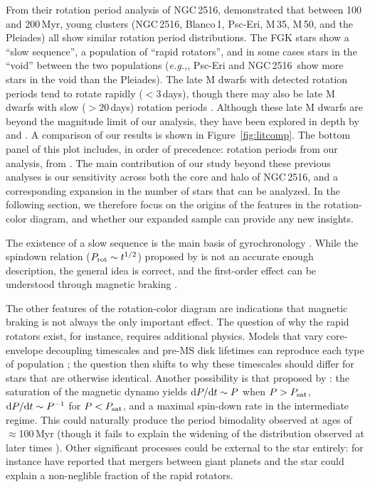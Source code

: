 \documentclass[12pt,twocolumn,tighten]{aastex63}
\newcommand{\cn}{NGC\,2516} %
\begin{document}
From their rotation period analysis of \cn,
\citet{fritzewski_rotation_2020} demonstrated that between 100 and
200\,Myr, young clusters (\cn, Blanco\,1, Psc-Eri, M\,35, M\,50, and
the Pleiades) all show similar rotation period distributions.  The FGK
stars show a ``slow sequence'', a population of ``rapid rotators'',
and in some cases stars in the ``void'' between the two populations
({\it e.g.,}, Psc-Eri and \cn\ show more stars in the void than the
Pleiades).  The late M dwarfs with detected rotation periods tend to
rotate rapidly ($<3$\,days), though there may also be late M dwarfs
with slow ($>20$\,days) rotation periods
\citep{stauffer_rotation_2016}.  Although these late M dwarfs are
beyond the magnitude limit of our analysis, they have been explored in
depth by \citet{Irwin_NGC2516_2007} and
\citet{fritzewski_rotation_2020}.  A comparison of our results is
shown in Figure~\ref{fig:litcomp}.  The bottom panel of this plot
includes, in order of precedence: rotation periods from our analysis,
from .  The main
contribution of our study beyond these previous analyses is our
sensitivity across both the core and halo of \cn, and a corresponding
expansion in the number of stars that can be analyzed.  In the
following section, we therefore focus on the origins of the features
in the rotation-color diagram, and whether our expanded sample can
provide any new insights.

The existence of a slow sequence is the main basis of gyrochronology
\citep[{\it e.g.},][]{barnes_rotational_2003}.  While the 
spindown relation ($P_{\rm rot}\sim t^{1/2}$) proposed by
\citet{skumanich_time_1972} is not an accurate enough description, the
general idea is correct, and the first-order effect can be understood
through magnetic braking \citep{weber_angular_1967}.

The other features of the rotation-color diagram are indications that
magnetic braking is not always the only important effect.  The
question of why the rapid rotators exist, for instance, requires
additional physics.  Models that vary core-envelope decoupling
timescales and pre-MS disk lifetimes can reproduce each type of
population
\citep{Irwin_NGC2516_2007,gallet_improved_2013,gallet_improved_2015};
the question then shifts to why these timescales should differ for
stars that are otherwise identical.  Another possibility
is that proposed by \citet{matt_mass-dependence_2015}: the
saturation of the magnetic dynamo yields ${\rm d}P/{\rm d}t \sim P$ when $P >
P_{\rm sat}$, ${\rm d}P/{\rm d}t \sim P^{-1}$ for $P < P_{\rm sat}$, and a
maximal spin-down rate in the intermediate regime.  This could
naturally produce the period bimodality observed at ages of
$\approx$100\,Myr (though it fails to explain the widening of the
distribution observed at later times
\citealt{godoyrivera_stellar_2021}).  Other significant processes
could be external to the star entirely: \citet{qureshi_signature_2018}
for instance have reported that mergers between giant planets and the
star could explain a non-neglible fraction of the rapid rotators.
\end{document}
